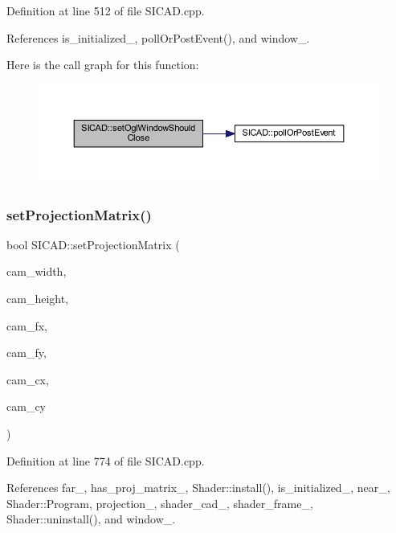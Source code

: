 Definition at line 512 of file S\+I\+C\+A\+D.\+cpp.



References is\+\_\+initialized\+\_\+, poll\+Or\+Post\+Event(), and window\+\_\+.

Here is the call graph for this function\+:
\nopagebreak
\begin{figure}[H]
\begin{center}
\leavevmode
\includegraphics[width=350pt]{classSICAD_a0e42acab32252ddc878794f365ee1037_cgraph}
\end{center}
\end{figure}
\mbox{\label{classSICAD_a39cdff6871d32429d8ba95b776e0b874}} 
\subsubsection{\texorpdfstring{set\+Projection\+Matrix()}{setProjectionMatrix()}}
{\footnotesize\ttfamily bool S\+I\+C\+A\+D\+::set\+Projection\+Matrix (\begin{DoxyParamCaption}\item[{const G\+Lsizei}]{cam\+\_\+width,  }\item[{const G\+Lsizei}]{cam\+\_\+height,  }\item[{const G\+Lfloat}]{cam\+\_\+fx,  }\item[{const G\+Lfloat}]{cam\+\_\+fy,  }\item[{const G\+Lfloat}]{cam\+\_\+cx,  }\item[{const G\+Lfloat}]{cam\+\_\+cy }\end{DoxyParamCaption})}



Definition at line 774 of file S\+I\+C\+A\+D.\+cpp.



References far\+\_\+, has\+\_\+proj\+\_\+matrix\+\_\+, Shader\+::install(), is\+\_\+initialized\+\_\+, near\+\_\+, Shader\+::\+Program, projection\+\_\+, shader\+\_\+cad\+\_\+, shader\+\_\+frame\+\_\+, Shader\+::uninstall(), and window\+\_\+.



